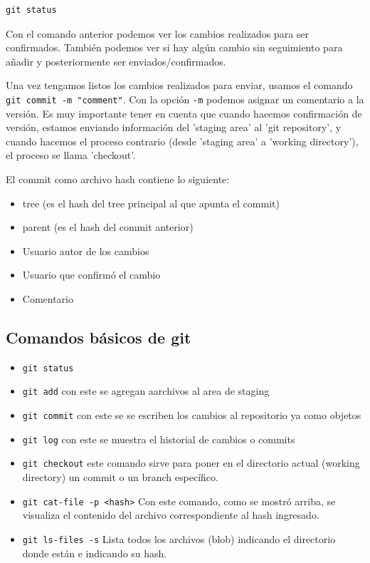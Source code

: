 \begin{verbatim}
git status
\end{verbatim}

Con el comando anterior podemos ver los cambios realizados para ser confirmados. También podemos ver si hay algún cambio sin seguimiento para añadir y posteriormente ser enviados/confirmados. 

Una vez tengamos listos los cambios realizados para enviar, usamos el comando \texttt{git commit -m "comment"}. Con la opción \texttt{-m} podemos asignar un comentario a la versión. Es muy importante tener en cuenta que cuando hacemos confirmación de versión, estamos enviando información del 'staging area' al 'git repository', y cuando hacemos el proceso contrario (desde 'staging area' a 'working directory'), el proceso se llama 'checkout'.

El commit como archivo hash contiene lo siguiente:

\begin{itemize}
    \item tree (es el hash del tree principal al que apunta el commit)
    \item parent (es el hash del commit anterior)
    \item Usuario autor de los cambios  
    \item Usuario que confirmó el cambio
    \item Comentario
\end{itemize}

\subsection{Comandos básicos de git}

\begin{itemize}
    \item \texttt{git status}
    \item \texttt{git add} con este se agregan aarchivos al area de staging
    \item \texttt{git commit} con este se se escriben los cambios al repositorio ya como objetos
    \item \texttt{git log} con este se muestra el historial de cambios o commits
    \item \texttt{git checkout} este comando sirve para poner en el directorio actual (working directory) un commit o un branch específico.
    \item \texttt{git cat-file -p <hash>} Con este comando, como se mostró arriba, se visualiza el contenido del archivo correspondiente al hash ingresado.
    \item \texttt{git ls-files -s} Lista todos los archivos (blob) indicando el directorio donde están e indicando su hash.
\end{itemize}



